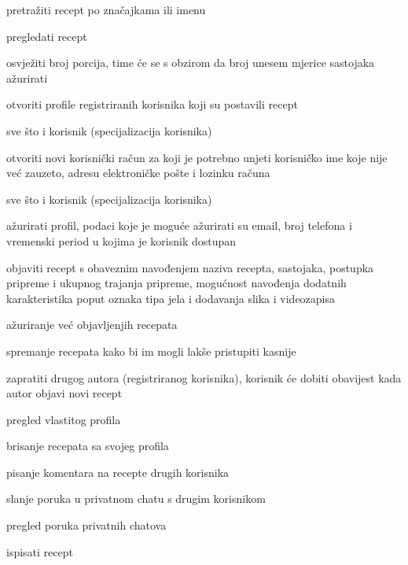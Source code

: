 			
			\begin{packed_enum}

				\item  {}
				
				\begin{packed_enum}
					
					\item pretražiti recept po značajkama ili imenu
					\item pregledati recept
					\item osvježiti broj porcija, time će se s obzirom da broj unesem mjerice sastojaka ažurirati
					\item otvoriti profile registriranih korisnika koji su postavili recept
					
				\end{packed_enum}

				\item  {}
				
				\begin{packed_enum}

					\item sve što i korisnik (specijalizacija korisnika)
					\item otvoriti novi korisnički račun za koji je potrebno unjeti korisničko ime koje nije već zauzeto, adresu elektroničke pošte i lozinku računa
					
				\end{packed_enum}

				\item  {}
				
				\begin{packed_enum}
					
					\item sve što i korisnik (specijalizacija korisnika)
					\item ažurirati profil, podaci koje je moguće ažurirati su email, broj telefona i vremenski period u kojima je korisnik dostupan
					\item objaviti recept s obaveznim navođenjem naziva recepta, sastojaka, postupka pripreme i ukupnog trajanja pripreme, mogućnost navođenja dodatnih karakteristika poput oznaka tipa jela i dodavanja slika i videozapisa
					\item ažuriranje već objavljenjih recepata
					\item spremanje recepata kako bi im mogli lakše pristupiti kasnije
					\item zapratiti drugog autora (registriranog korisnika), korisnik će dobiti obavijest kada autor objavi novi recept
					\item pregled vlastitog profila
					\item brisanje recepata sa svojeg profila
					\item pisanje komentara na recepte drugih korisnika
					\item slanje poruka u privatnom chatu s drugim korisnikom
					\item pregled poruka privatnih chatova
					\item ispisati recept
					

\end{packed_enum}
\end{packed_enum}
